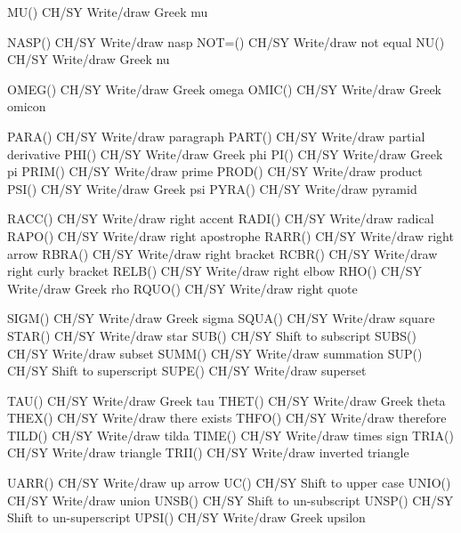 MU()                        CH/SY Write/draw Greek mu

NASP()                      CH/SY Write/draw nasp
NOT=()                      CH/SY Write/draw not equal
NU()                        CH/SY Write/draw Greek nu

OMEG()                      CH/SY Write/draw Greek omega
OMIC()                      CH/SY Write/draw Greek omicon

PARA()                      CH/SY Write/draw paragraph
PART()                      CH/SY Write/draw partial derivative
PHI()                       CH/SY Write/draw Greek phi
PI()                        CH/SY Write/draw Greek pi
PRIM()                      CH/SY Write/draw prime
PROD()                      CH/SY Write/draw product
PSI()                       CH/SY Write/draw Greek psi
PYRA()                      CH/SY Write/draw pyramid

RACC()                      CH/SY Write/draw right accent
RADI()                      CH/SY Write/draw radical
RAPO()                      CH/SY Write/draw right apostrophe
RARR()                      CH/SY Write/draw right arrow
RBRA()                      CH/SY Write/draw right bracket
RCBR()                      CH/SY Write/draw right curly bracket
RELB()                      CH/SY Write/draw right elbow
RHO()                       CH/SY Write/draw Greek rho
RQUO()                      CH/SY Write/draw right quote

SIGM()                      CH/SY Write/draw Greek sigma
SQUA()                      CH/SY Write/draw square
STAR()                      CH/SY Write/draw star
SUB()                       CH/SY Shift to subscript
SUBS()                      CH/SY Write/draw subset
SUMM()                      CH/SY Write/draw summation
SUP()                       CH/SY Shift to superscript
SUPE()                      CH/SY Write/draw superset

TAU()                       CH/SY Write/draw Greek tau
THET()                      CH/SY Write/draw Greek theta
THEX()                      CH/SY Write/draw there exists
THFO()                      CH/SY Write/draw therefore
TILD()                      CH/SY Write/draw tilda
TIME()                      CH/SY Write/draw times sign
TRIA()                      CH/SY Write/draw triangle
TRII()                      CH/SY Write/draw inverted triangle

UARR()                      CH/SY Write/draw up arrow
UC()                        CH/SY Shift to upper case
UNIO()                      CH/SY Write/draw union
UNSB()                      CH/SY Shift to un-subscript
UNSP()                      CH/SY Shift to un-superscript
UPSI()                      CH/SY Write/draw Greek upsilon

